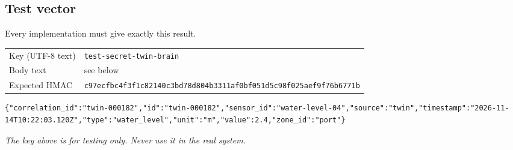 \documentclass[11pt,a4paper]{article}
\newcommand{\code}[1]{\texttt{#1}}
\begin{document}
\subsection{Test vector}
Every implementation must give exactly this result.

\begin{tabularx}{\linewidth}{@{}l Y@{}}
\toprule
Key (UTF-8 text) & \code{test-secret-twin-brain} \\
Body text & see below \\
Expected HMAC & \code{c97ecfbc4f3f1c82140c3bd78d804b33}\linebreak\code{11af0bf051d5c98f025aef9f76b6771b} \\
\bottomrule
\end{tabularx}

\begin{lstlisting}
{"correlation_id":"twin-000182","id":"twin-000182","sensor_id":"water-level-04","source":"twin","timestamp":"2026-11-14T10:22:03.120Z","type":"water_level","unit":"m","value":2.4,"zone_id":"port"}
\end{lstlisting}

\textit{The key above is for testing only. Never use it in the real system.}
\end{document}
